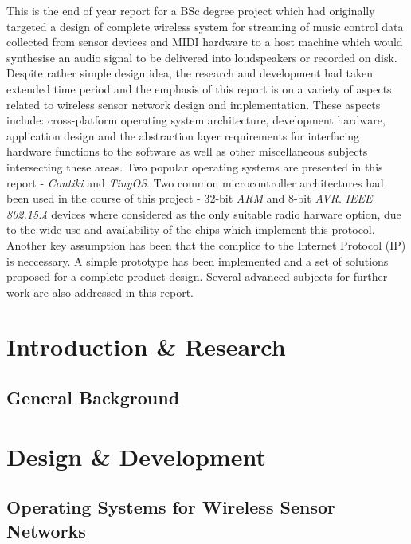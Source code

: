 \abstract
{

   This is the end of year report for a BSc degree project which had originally
   targeted a design of complete wireless system for streaming of music control
   data collected from sensor devices and MIDI hardware to a host machine which
   would synthesise an audio signal to be delivered into loudspeakers or recorded
   on disk. Despite rather simple design idea, the research and development had
   taken extended time period and the emphasis of this report is on a variety of
   aspects related to wireless sensor network design and implementation. These
   aspects include: cross-platform operating system architecture, development
   hardware, application design and the abstraction layer requirements for
   interfacing hardware functions to the software as well as other miscellaneous
   subjects intersecting these areas. Two popular operating systems are presented
   in this report - \emph{Contiki} and \emph{TinyOS}. Two common microcontroller
   architectures had been used in the course of this project - 32-bit \emph{ARM}
   and 8-bit \emph{AVR}. \emph{IEEE 802.15.4} devices where considered as the
   only suitable radio harware option, due to the wide use and availability of
   the chips which implement this protocol. Another key assumption has been that
   the complice to the Internet Protocol (IP) is neccessary. A simple prototype
   has been implemented and a set of solutions proposed for a complete product
   design. Several advanced subjects for further work are also addressed in this
   report.

}

\tableofcontents
\listoffigures


\part{Introduction \& Research}
\chapter{General Background}



\part{Design \& Development} 
\chapter{Operating Systems for Wireless Sensor Networks}



